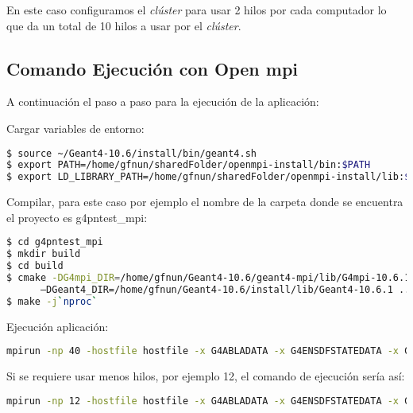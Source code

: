 En este caso configuramos el \emph{clúster} para usar 2 hilos por cada computador lo que da un total de 10 hilos a usar por el \emph{clúster}.

\newpage

\subsection{Comando Ejecución con Open mpi}

A continuación el paso a paso para la ejecución de la aplicación:

Cargar variables de entorno:

\begin{lstlisting}[language=bash,style=mystyle]
$ source ~/Geant4-10.6/install/bin/geant4.sh
$ export PATH=/home/gfnun/sharedFolder/openmpi-install/bin:$PATH
$ export LD_LIBRARY_PATH=/home/gfnun/sharedFolder/openmpi-install/lib:$LD_LIBRARY_PATH
\end{lstlisting}


Compilar, para este caso por ejemplo el nombre de la carpeta donde se encuentra el proyecto es g4pntest_mpi:

\begin{lstlisting}[language=bash,style=mystyle]
$ cd g4pntest_mpi
$ mkdir build
$ cd build
$ cmake -DG4mpi_DIR=/home/gfnun/Geant4-10.6/geant4-mpi/lib/G4mpi-10.6.1 -DCMAKE_CXX_COMPILER=/home/gfnun/sharedFolder/openmpi-install/bin/mpicxx \
      –DGeant4_DIR=/home/gfnun/Geant4-10.6/install/lib/Geant4-10.6.1 ../
$ make -j`nproc`
\end{lstlisting}

Ejecución aplicación:

\begin{lstlisting}[language=bash,style=mystyle]
mpirun -np 40 -hostfile hostfile -x G4ABLADATA -x G4ENSDFSTATEDATA -x G4INCLDATA -x G4LEDATA -x G4LEVELGAMMADATA -x G4NEUTRONHPDATA -x G4PARTICLEXSDATA -x G4PIIDATA -x G4REALSURFACEDATA -x G4SAIDXSDATA -x G4RADIOACTIVEDATA -oversubscribe ./PNtest ../macros/THEmacro.mac
\end{lstlisting}

Si se requiere usar menos hilos, por ejemplo 12, el comando de ejecución sería así:

\begin{lstlisting}[language=bash,style=mystyle]
mpirun -np 12 -hostfile hostfile -x G4ABLADATA -x G4ENSDFSTATEDATA -x G4INCLDATA -x G4LEDATA -x G4LEVELGAMMADATA -x G4NEUTRONHPDATA -x G4PARTICLEXSDATA -x G4PIIDATA -x G4REALSURFACEDATA -x G4SAIDXSDATA -x G4RADIOACTIVEDATA -oversubscribe ./PNtest ../macros/THEmacro.mac
\end{lstlisting}


\newpage




